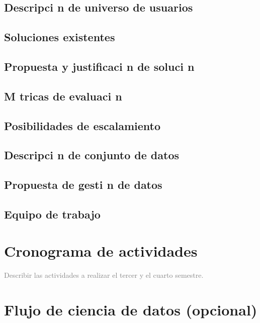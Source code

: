 \documentclass{article}
\begin{document}
\subsection*{Descripci n de universo de  usuarios}

\subsection*{Soluciones existentes}  

\subsection*{Propuesta y justificaci n de soluci n}

\subsection*{M tricas de evaluaci n}

\subsection*{Posibilidades de escalamiento}

\subsection*{Descripci n de conjunto de datos}

\subsection*{Propuesta de gesti n de datos}

\subsection*{Equipo de trabajo}


\section{Cronograma de actividades}

\noindent \textcolor{gray}{Describir las actividades a realizar el tercer y el cuarto semestre.}

\section{Flujo de ciencia de datos (opcional)}
\end{document}
